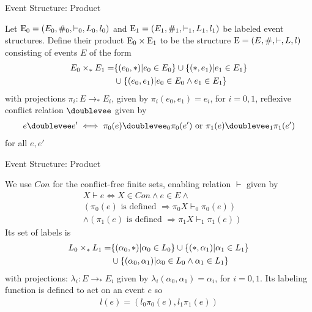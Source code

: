 \begin{frame}{Event Structure: Product}
    \begin{definition}
        Let $\mathrm{E_0} = (E_0,\#_0,\vdash_0,L_0,l_0)$ and
        $\mathrm{E_1} = (E_1,\#_1,\vdash_1,L_1,l_1)$
        be labeled event structures.
        Define their product $\mathrm{E_0} \times \mathrm{E_1}$ to be the structure $\mathrm{E} = (E,\#,\vdash,L,l)$
        consisting of events $E$ of the form
        \begin{align*}
            E_0 \times_* E_1 = &
            \{(e_0,*)|e_0 \in E_0\}
            \cup \{(*,e_1)|e_1 \in E_1\} \\
            & \cup \{(e_0,e_1)| e_0 \in E_0 \wedge e_1 \in E_1\}
        \end{align*}
        with projections $\pi_i : E \rightarrow_* E_i$,
        given by $\pi_i(e_0,e_1) = e_i$, for $i=0,1$, reflexive conflict relation $\doublevee$ given by
        \begin{align*}
            e \doublevee e' \iff \pi_0(e) \doublevee_0 \pi_0(e') \text{ or }
            \pi_1(e) \doublevee_1 \pi_1(e')
        \end{align*}
        for all $e,e'$ 
    \end{definition}
\end{frame}

\begin{frame}{Event Structure: Product}
    \begin{definition}
        We use $Con$ for the conflict-free finite sets,
        enabling relation $\vdash$ given by
        \begin{align*}
             & X \vdash e \iff X \in Con \wedge e \in E \wedge                  \\
             & (\pi_0(e)\text{ is defined } \Rightarrow \pi_0X\vdash_0\pi_0(e)) \\
             & \wedge (\pi_1(e)\text{ is defined } \Rightarrow \pi_1X\vdash_1\pi_1(e))
        \end{align*}
        Its set of labels is
        \begin{align*}
            L_0 \times_* L_1 = & \{ (\alpha_0,*)|\alpha_0 \in L_0\}
            \cup \{(*,\alpha_1)|\alpha_1 \in L_1\} \\
            & \cup \{(\alpha_0,\alpha_1)|\alpha_0 \in L_0 \wedge \alpha_1 \in L_1\}
        \end{align*}
        with projections: $\lambda_i: E \rightarrow_* E_i$ given by
        $\lambda_i(\alpha_0,\alpha_1) = \alpha_i$, for $i=0,1$.
        Its labeling function is defined to act on an event $e$ so
        \begin{align*}
            l(e) = (l_0\pi_0(e),l_1\pi_1(e))
        \end{align*}
    \end{definition}
\end{frame}

